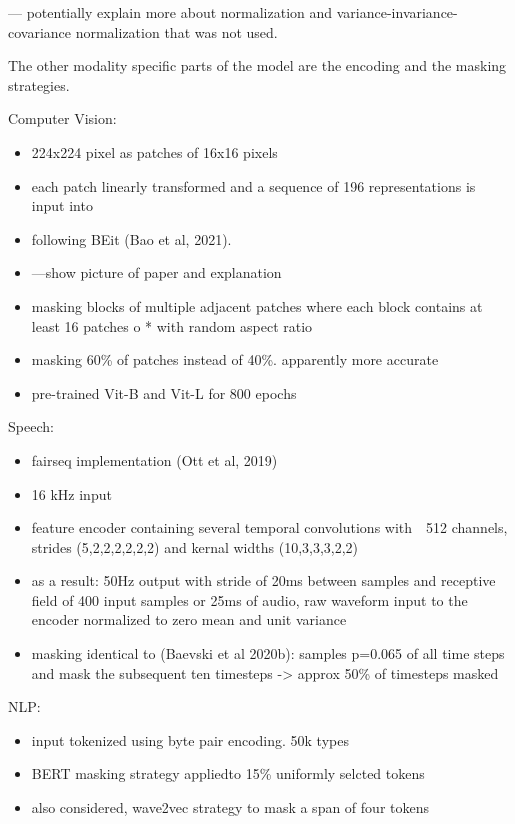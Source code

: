 \documentclass[
]{krantz}
\providecommand{\tightlist}{%
  \setlength{\itemsep}{0pt}\setlength{\parskip}{0pt}}
\begin{document}
--- potentially explain more about normalization and variance-invariance-covariance normalization that was not used.

The other modality specific parts of the model are the encoding and the masking strategies.

Computer Vision:

\begin{itemize}
\item
  224x224 pixel as patches of 16x16 pixels
\item
  each patch linearly transformed and a sequence of 196 representations is input into
\item
  following BEit (Bao et al, 2021).
\item
  ---show picture of paper and explanation
\item
  masking blocks of multiple adjacent patches where each block contains at least 16 patches o * with random aspect ratio
\item
  masking 60\% of patches instead of 40\%. apparently more accurate
\item
  pre-trained Vit-B and Vit-L for 800 epochs
\end{itemize}

Speech:

\begin{itemize}
\tightlist
\item
  fairseq implementation (Ott et al, 2019)
\item
  16 kHz input
\item
  feature encoder containing several temporal convolutions with   512 channels, strides (5,2,2,2,2,2,2) and kernal widths (10,3,3,3,2,2)
\item
  as a result: 50Hz output with stride of 20ms between samples and receptive field of 400 input samples or 25ms of audio, raw waveform input to the encoder normalized to zero mean and unit variance
\item
  masking identical to (Baevski et al 2020b): samples p=0.065 of all time steps and mask the subsequent ten timesteps -\textgreater{} approx 50\% of timesteps masked
\end{itemize}

NLP:

\begin{itemize}
\tightlist
\item
  input tokenized using byte pair encoding. 50k types
\item
  BERT masking strategy appliedto 15\% uniformly selcted tokens
\item
  also considered, wave2vec strategy to mask a span of four tokens
\end{itemize}
\end{document}
